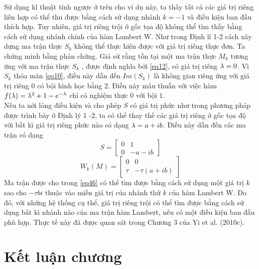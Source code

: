 Sử dụng kĩ thuật tính ngược ở trên cho ví dụ này, ta thấy tất cả các giá trị riêng liên hợp có thể thu được bằng cách sử dụng nhánh $k = -1$ và điều kiện ban đầu thích hợp. Tuy nhiên, giá trị riêng trội ở gốc tọa độ không thể tìm thấy bằng cách sử dụng nhánh chính của hàm Lambert W. Như trong Định lí 1-2 cách xây dựng ma trận thực $S_k$ không thể thực hiện được với giá trị riêng thực đơn. Ta chứng minh bằng phản chứng. Giả sử rằng tồn tại một ma trận thực $M_k$ tương ứng với ma trận thực $S_k$ , được định nghĩa bởi \eqref{eq12}, có giá trị riêng $\lambda = 0$. Vì $S_k$ thỏa mãn \eqref{eq10}, điều này dẫn đến $Im(S_k)$ là không gian riêng ứng với giá trị riêng $0$ có bội hình học bằng $2$. Điều này mâu thuẫn với việc hàm $f(\lambda) = \lambda^2 + 1 - e^{-\lambda}$ chỉ có nghiệm thực $0$ với bội $1$.\\
Nếu ta nới lỏng điều kiện và cho phép $S$ có giá trị phức như trong phương pháp được trình bày ở Định lý 1 -2, ta có thể thay thế các giá trị riêng ở gốc tọa độ với bất kì giá trị riêng phức nào có dạng $\lambda = a + ib$. Điều này dẫn đến các ma trận có dạng
\begin{equation}\label{eq45}
	S = \begin{bmatrix}
		0 & 1\\
		0 & - a - ib
	\end{bmatrix}
\end{equation}
\begin{equation}\label{eq46}
	W_k(M) = \begin{bmatrix}
		0 & 0\\
		\tau & -\tau(a+ib)
	\end{bmatrix}
\end{equation}
Ma trận được cho trong \eqref{eq46} có thể tìm được bằng cách sử dụng một giá trị $k$ sao cho $-\tau bi$ thuộc vào miền giá trị của nhánh thứ $k$ của hàm Lambert W. Do đó, với những hệ thống cụ thể, giá trị riêng trội có thể tìm được bằng cách sử dụng bất kì nhánh nào của ma trận hàm Lambert, nếu có một điều kiện ban đầu phù hợp. Thực tế này đã được quan sát trong Chương 3 của Yi et al. (2010c).

\section{Kết luận chương}



